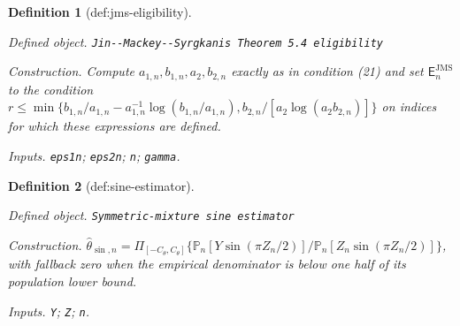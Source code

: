 \documentclass{article}
\newtheorem{definition}{Definition}
\begin{document}
\begin{definition}[def:jms-eligibility]\label{def:jms-eligibility}
\par\smallskip\noindent\emph{Defined object.} \texttt{Jin-\allowbreak{}-\allowbreak{}Mackey-\allowbreak{}-\allowbreak{}Syrgkanis Theorem 5.4 eligibility}
\par\smallskip\noindent\emph{Construction.} Compute \(a_{1,n},b_{1,n},a_2,b_{2,n}\) exactly as in condition (21) and set \(\mathsf E_n^{\mathrm{JMS}}\) to the condition \(r\le\min\{b_{1,n}/a_{1,n}-a_{1,n}^{-1}\log(b_{1,n}/a_{1,n}),b_{2,n}/[a_2\log(a_2b_{2,n})]\}\) on indices for which these expressions are defined.
\par\smallskip\noindent\emph{Inputs.} \texttt{eps1n}; \texttt{eps2n}; \texttt{n}; \texttt{gamma}.
\end{definition}

\begin{definition}[def:sine-estimator]\label{def:sine-estimator}
\par\smallskip\noindent\emph{Defined object.} \texttt{Symmetric-\allowbreak{}mixture sine estimator}
\par\smallskip\noindent\emph{Construction.} \(\widehat\theta_{\sin,n}=\Pi_{[-C_{\theta},C_{\theta}]}\{\mathbb P_n[Y\sin(\pi Z_n/2)]/\mathbb P_n[Z_n\sin(\pi Z_n/2)]\}\), with fallback zero when the empirical denominator is below one half of its population lower bound.
\par\smallskip\noindent\emph{Inputs.} \texttt{Y}; \texttt{Z}; \texttt{n}.
\end{definition}
\end{document}

